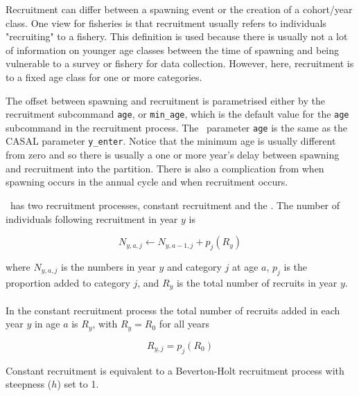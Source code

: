 Recruitment can differ between a spawning event or the creation of a cohort/year class. One view for fisheries is that recruitment usually refers to individuals "recruiting" to a fishery. This definition is used because there is usually not a lot of information on younger age classes between the time of spawning and being vulnerable to a survey or fishery for data collection. However, here, recruitment is to a fixed age class for one or more categories.

The offset between spawning and recruitment is parametrised either by the recruitment subcommand \texttt{age}, or \texttt{min\_age}, which is the default value for the \texttt{age} subcommand in the recruitment process. The \CNAME\ parameter \texttt{age} is the same as the CASAL parameter \texttt{y\_enter}. Notice that the minimum age is usually different from zero and so there is usually  a one or more year's delay between spawning and recruitment into the partition. There is also a complication from when spawning occurs in the annual cycle and when recruitment occurs.

\CNAME\ has two  recruitment processes, constant recruitment and the  \citep{1203}. The  number of individuals following recruitment in year $y$ is

\begin{equation}
N_{y,a,j} \leftarrow N_{y,a - 1,j} + p_j(R_y)
\end{equation}

where $N_{y,a,j}$ is the numbers in year $y$ and category $j$ at age $a$, $p_j$ is the proportion added to category $j$, and $R_y$ is the total number of recruits in year $y$.

\paragraph{}\label{sec:Process-RecruitmentConstant}

In the constant recruitment process the total number of recruits added in each year $y$ in age $a$ is $R_y$, with $R_y = R_0$ for all years

\begin{equation}
  R_{y,j} = p_j(R_0)
\end{equation}

Constant recruitment is equivalent to a Beverton-Holt recruitment process with steepness ($h$) set to 1.

